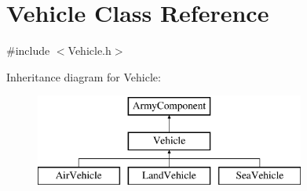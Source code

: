 \hypertarget{class_vehicle}{}\section{Vehicle Class Reference}
\label{class_vehicle}


{\ttfamily \#include $<$Vehicle.\+h$>$}

Inheritance diagram for Vehicle\+:\begin{figure}[H]
\begin{center}
\leavevmode
\includegraphics[height=3.000000cm]{class_vehicle}
\end{center}
\end{figure}
